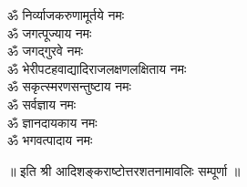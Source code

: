 \begin{multicols}{2}
\begin{flushleft}
        ॐ निर्व्याजकरुणामूर्तये नमः\\
        ॐ जगत्पूज्याय नमः\\
        ॐ जगद्गुरवे नमः\\
        ॐ भेरी\-पटह\-वाद्यादि\-राजलक्षण\-लक्षिताय नमः\\
        ॐ सकृत्स्मरणसन्तुष्टाय नमः\\
        ॐ सर्वज्ञाय नमः\\
        ॐ ज्ञानदायकाय नमः\\
        ॐ भगवत्पादाय नमः\hfill{}\\
                                                                                
    \end{flushleft}
\end{multicols}
\centerline{॥ इति श्री आदिशङ्कराष्टोत्तरशतनामावलिः  सम्पूर्णा ॥}
